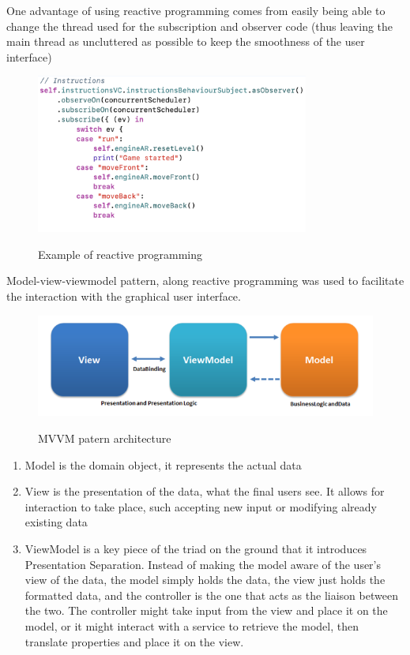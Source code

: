 \documentclass[12 pct]{report}
\begin{document}
One advantage of using reactive programming comes from easily being able to change the thread used for the subscription and observer code (thus leaving the main thread as uncluttered as possible to keep the smoothness of the user interface)
\begin{figure}[H]
\includegraphics[width=0.8\textwidth]{reactive-instructions}
\centering
\label{fig:reactive-repository}
\caption{Example of reactive programming }
\end{figure}

Model-view-viewmodel pattern, along reactive programming was used to facilitate the interaction with the graphical user interface.

\begin{figure}[H]
\includegraphics[width=1.0\textwidth]{mvvm}
\centering
\label{fig:reactive-repository}
\caption{MVVM patern architecture }
\end{figure}

\begin{enumerate}
\item Model is the domain object, it represents the actual data 
\item View is the presentation of the data, what the final users see. It allows for interaction to take place, such accepting new input or  modifying already existing data
\item ViewModel is a key piece of the triad on the ground that it introduces Presentation Separation.  Instead of making the model aware of the user’s view of the data, the model simply holds the data, the view just holds the formatted data, and the controller is the one that acts as the liaison between the two. The controller might take input from the view and place it on the model, or it might interact with a service to retrieve the model, then translate properties and place it on the view.
\end{enumerate}
\end{document}
